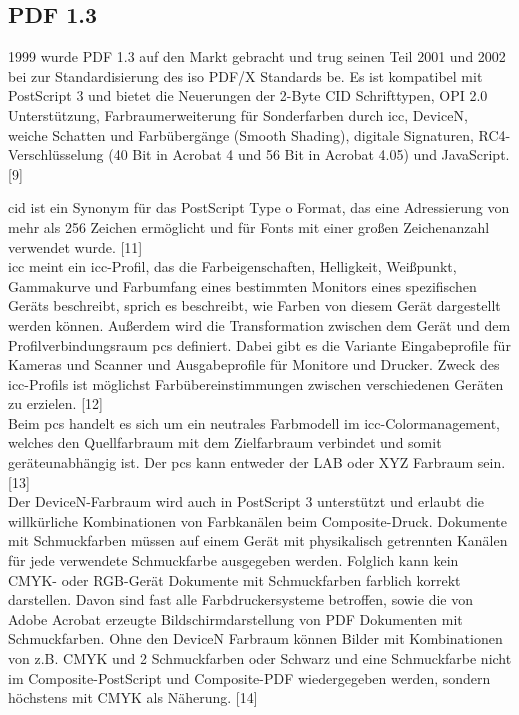 \subsection{PDF 1.3}
1999 wurde PDF 1.3 auf den Markt gebracht und trug seinen Teil 2001 und 2002 bei zur Standardisierung des \gls{iso} PDF/X Standards be. Es ist kompatibel mit PostScript 3 und bietet die Neuerungen der 2-Byte CID Schrifttypen, OPI 2.0 Unterstützung, Farbraumerweiterung für Sonderfarben durch \gls{icc}, DeviceN, weiche Schatten und Farbübergänge (Smooth Shading), digitale Signaturen, RC4-Verschlüsselung (40 Bit in Acrobat 4 und 56 Bit in Acrobat 4.05) und JavaScript. [9]
\par
\gls{cid} ist ein Synonym für das PostScript Type o Format, das eine Adressierung von mehr als 256 Zeichen ermöglicht und für Fonts mit einer großen Zeichenanzahl verwendet wurde. [11] \\
\gls{icc} meint ein \gls{icc}-Profil, das die Farbeigenschaften, Helligkeit, Weißpunkt, Gammakurve und Farbumfang eines bestimmten Monitors eines spezifischen Geräts beschreibt, sprich es beschreibt, wie Farben von diesem Gerät dargestellt werden können. Außerdem wird die Transformation zwischen dem Gerät und dem Profilverbindungsraum \gls{pcs} definiert. Dabei gibt es die Variante Eingabeprofile für Kameras und Scanner und Ausgabeprofile für Monitore und Drucker. Zweck des \gls{icc}-Profils ist möglichst Farbübereinstimmungen zwischen verschiedenen Geräten zu erzielen. [12] \\
Beim \gls{pcs} handelt es sich um ein neutrales Farbmodell im \gls{icc}-Colormanagement, welches den Quellfarbraum mit dem Zielfarbraum verbindet und somit geräteunabhängig ist. Der \gls{pcs} kann entweder der LAB oder XYZ Farbraum sein. [13] \\
Der DeviceN-Farbraum wird auch in PostScript 3 unterstützt und erlaubt die willkürliche Kombinationen von Farbkanälen beim Composite-Druck. Dokumente mit Schmuckfarben müssen auf einem Gerät mit physikalisch getrennten Kanälen für jede verwendete Schmuckfarbe ausgegeben werden. Folglich kann kein CMYK- oder RGB-Gerät Dokumente mit Schmuckfarben farblich korrekt darstellen. Davon sind fast alle Farbdruckersysteme betroffen, sowie die von Adobe Acrobat erzeugte Bildschirmdarstellung von PDF Dokumenten mit Schmuckfarben. Ohne den DeviceN Farbraum können Bilder mit Kombinationen von z.B. CMYK und 2 Schmuckfarben oder Schwarz und eine Schmuckfarbe nicht im Composite-PostScript und Composite-PDF wiedergegeben werden, sondern höchstens mit CMYK als Näherung. [14]


